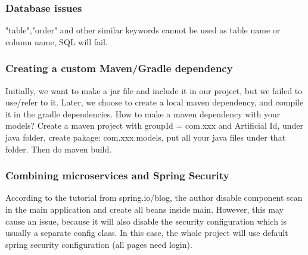 \documentclass[12pt]{article}
\begin{document}
\subsubsection{Database issues}
"table","order" and other similar keywords cannot be used as table name or column name, SQL will fail.

\subsubsection{Creating a custom Maven/Gradle dependency}\label{iss:mavenrepo}
Initially, we want to make a jar file and include it in our project, but we failed to use/refer to it. Later, we choose to create a local maven dependency, and compile it in the gradle dependencies.
How to make a maven dependency with your models?
Create a maven project with groupId = com.xxx and Artificial Id, under java folder, create pakage: com.xxx.models, put all your java files under that folder. Then do maven build.

\subsubsection{Combining microservices and Spring Security}
According to the tutorial from spring.io/blog, the author disable component scan in the main application and create all beans inside main.
However, this may cause an issue, because it will also disable the security configuration which is usually a separate config class. In this case, the whole project will use default spring security configuration (all pages need login).
\end{document}
